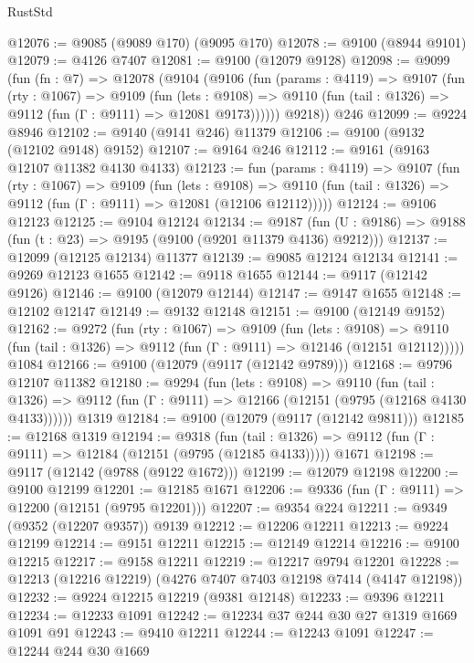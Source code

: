 \begin{lexlean}{RustStd}
\begin{coremodule}
@12076 := @9085 (@9089 @170) (@9095 @170)
@12078 := @9100 (@8944 @9101)
@12079 := @4126 @7407
@12081 := @9100 (@12079 @9128)
@12098 := @9099
    (fun (fn : @7) =>
    @12078
      (@9104
        (@9106
          (fun (params : @4119) =>
          @9107
            (fun (rty : @1067) =>
            @9109
              (fun (lets : @9108) =>
              @9110 (fun (tail : @1326) => @9112 (fun (Γ : @9111) => @12081 @9173))))))
        @9218))
    @246
@12099 := @9224 @8946
@12102 := @9140 (@9141 @246) @11379
@12106 := @9100 (@9132 (@12102 @9148) @9152)
@12107 := @9164 @246
@12112 := @9161 (@9163 @12107 @11382 @4130 @4133)
@12123 := fun (params : @4119) =>
  @9107
    (fun (rty : @1067) =>
    @9109
      (fun (lets : @9108) =>
      @9110 (fun (tail : @1326) => @9112 (fun (Γ : @9111) => @12081 (@12106 @12112)))))
@12124 := @9106 @12123
@12125 := @9104 @12124
@12134 := @9187
    (fun (U : @9186) => @9188 (fun (t : @23) => @9195 (@9100 (@9201 @11379 @4136) @9212)))
@12137 := @12099 (@12125 @12134) @11377
@12139 := @9085 @12124 @12134
@12141 := @9269 @12123 @1655
@12142 := @9118 @1655
@12144 := @9117 (@12142 @9126)
@12146 := @9100 (@12079 @12144)
@12147 := @9147 @1655
@12148 := @12102 @12147
@12149 := @9132 @12148
@12151 := @9100 (@12149 @9152)
@12162 := @9272
    (fun (rty : @1067) =>
    @9109
      (fun (lets : @9108) =>
      @9110 (fun (tail : @1326) => @9112 (fun (Γ : @9111) => @12146 (@12151 @12112)))))
    @1084
@12166 := @9100 (@12079 (@9117 (@12142 @9789)))
@12168 := @9796 @12107 @11382
@12180 := @9294
    (fun (lets : @9108) =>
    @9110
      (fun (tail : @1326) =>
      @9112 (fun (Γ : @9111) => @12166 (@12151 (@9795 (@12168 @4130 @4133))))))
    @1319
@12184 := @9100 (@12079 (@9117 (@12142 @9811)))
@12185 := @12168 @1319
@12194 := @9318
    (fun (tail : @1326) => @9112 (fun (Γ : @9111) => @12184 (@12151 (@9795 (@12185 @4133)))))
    @1671
@12198 := @9117 (@12142 (@9788 (@9122 @1672)))
@12199 := @12079 @12198
@12200 := @9100 @12199
@12201 := @12185 @1671
@12206 := @9336 (fun (Γ : @9111) => @12200 (@12151 (@9795 @12201)))
@12207 := @9354 @224
@12211 := @9349 (@9352 (@12207 @9357)) @9139
@12212 := @12206 @12211
@12213 := @9224 @12199
@12214 := @9151 @12211
@12215 := @12149 @12214
@12216 := @9100 @12215
@12217 := @9158 @12211
@12219 := @12217 @9794 @12201
@12228 := @12213 (@12216 @12219) (@4276 @7407 @7403 @12198 @7414 (@4147 @12198))
@12232 := @9224 @12215 @12219 (@9381 @12148)
@12233 := @9396 @12211
@12234 := @12233 @1091
@12242 := @12234 @37 @244 @30 @27 @1319 @1669 @1091 @91
@12243 := @9410 @12211
@12244 := @12243 @1091
@12247 := @12244 @244 @30 @1669

\end{coremodule}
\end{lexlean}
